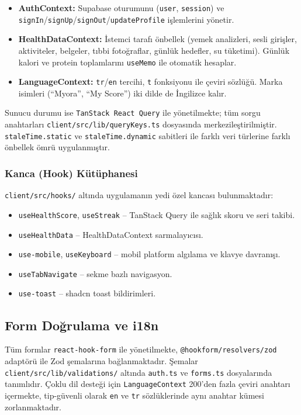 \begin{itemize}
    \item \textbf{AuthContext:} Supabase oturumunu (\texttt{user}, \texttt{session}) ve \texttt{signIn}/\texttt{signUp}/\texttt{signOut}/\texttt{updateProfile} işlemlerini yönetir.
    \item \textbf{HealthDataContext:} İstemci tarafı önbellek (yemek analizleri, sesli girişler, aktiviteler, belgeler, tıbbi fotoğraflar, günlük hedefler, su tüketimi). Günlük kalori ve protein toplamlarını \texttt{useMemo} ile otomatik hesaplar.
    \item \textbf{LanguageContext:} \texttt{tr}/\texttt{en} tercihi, \texttt{t} fonksiyonu ile çeviri sözlüğü. Marka isimleri (\enquote{Myora}, \enquote{My Score}) iki dilde de İngilizce kalır.
\end{itemize}

Sunucu durumu ise \texttt{TanStack React Query} ile yönetilmekte; tüm sorgu anahtarları \texttt{client/src/lib/queryKeys.ts} dosyasında merkezileştirilmiştir. \texttt{staleTime.static} ve \texttt{staleTime.dynamic} sabitleri ile farklı veri türlerine farklı önbellek ömrü uygulanmıştır.

\subsubsection{Kanca (Hook) Kütüphanesi}

\texttt{client/src/hooks/} altında uygulamanın yedi özel kancası bulunmaktadır:
\begin{itemize}
    \item \texttt{useHealthScore}, \texttt{useStreak} -- TanStack Query ile sağlık skoru ve seri takibi.
    \item \texttt{useHealthData} -- HealthDataContext sarmalayıcısı.
    \item \texttt{use-mobile}, \texttt{useKeyboard} -- mobil platform algılama ve klavye davranışı.
    \item \texttt{useTabNavigate} -- sekme bazlı navigasyon.
    \item \texttt{use-toast} -- shadcn toast bildirimleri.
\end{itemize}

\subsection{Form Doğrulama ve i18n}

Tüm formlar \texttt{react-hook-form} ile yönetilmekte, \texttt{@hookform/resolvers/zod} adaptörü ile Zod şemalarına bağlanmaktadır. Şemalar \texttt{client/src/lib/validations/} altında \texttt{auth.ts} ve \texttt{forms.ts} dosyalarında tanımlıdır. Çoklu dil desteği için \texttt{LanguageContext} 200'den fazla çeviri anahtarı içermekte, tip-güvenli olarak \texttt{en} ve \texttt{tr} sözlüklerinde aynı anahtar kümesi zorlanmaktadır.


